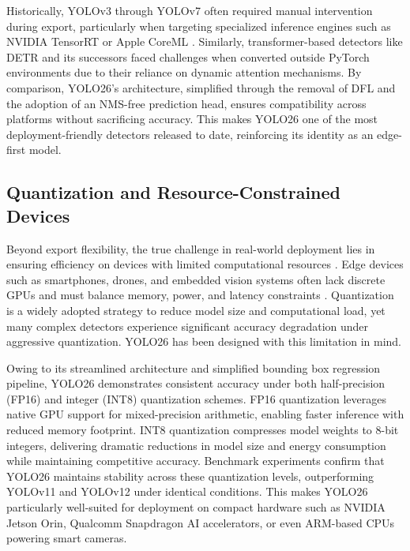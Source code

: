 \documentclass{article}
\begin{document}
Historically, YOLOv3 through YOLOv7 often required manual intervention during export, particularly when targeting specialized inference engines such as NVIDIA TensorRT or Apple CoreML \cite{kusuma2023multi, surantha2025key}. Similarly, transformer-based detectors like DETR and its successors faced challenges when converted outside PyTorch environments due to their reliance on dynamic attention mechanisms. By comparison, YOLO26’s architecture, simplified through the removal of DFL and the adoption of an NMS-free prediction head, ensures compatibility across platforms without sacrificing accuracy. This makes YOLO26 one of the most deployment-friendly detectors released to date, reinforcing its identity as an edge-first model.

\subsection{Quantization and Resource-Constrained Devices}

Beyond export flexibility, the true challenge in real-world deployment lies in ensuring efficiency on devices with limited computational resources \cite{hosain2024synchronizing, abdulhaq2025real}. Edge devices such as smartphones, drones, and embedded vision systems often lack discrete GPUs and must balance memory, power, and latency constraints \cite{hossain2019deep, setyanto2023near}. Quantization is a widely adopted strategy to reduce model size and computational load, yet many complex detectors experience significant accuracy degradation under aggressive quantization. YOLO26 has been designed with this limitation in mind.

Owing to its streamlined architecture and simplified bounding box regression pipeline, YOLO26 demonstrates consistent accuracy under both half-precision (FP16) and integer (INT8) quantization schemes. FP16 quantization leverages native GPU support for mixed-precision arithmetic, enabling faster inference with reduced memory footprint. INT8 quantization compresses model weights to 8-bit integers, delivering dramatic reductions in model size and energy consumption while maintaining competitive accuracy. Benchmark experiments confirm that YOLO26 maintains stability across these quantization levels, outperforming YOLOv11 and YOLOv12 under identical conditions. This makes YOLO26 particularly well-suited for deployment on compact hardware such as NVIDIA Jetson Orin, Qualcomm Snapdragon AI accelerators, or even ARM-based CPUs powering smart cameras.
\end{document}
